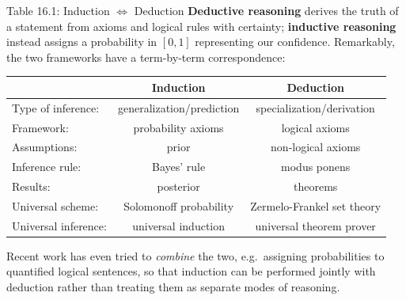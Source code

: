 \documentclass[aspectratio=169,10pt]{beamer}
\begin{document}
\begin{frame}{Table 16.1: Induction $\Leftrightarrow$ Deduction}
  \small
  \textbf{Deductive reasoning} derives the truth of a statement from
  axioms and logical rules with certainty; \textbf{inductive reasoning}
  instead assigns a probability in $[0,1]$ representing our confidence.
  Remarkably, the two frameworks have a term-by-term correspondence:

  \begin{center}
  \renewcommand{\arraystretch}{1.15}
  \begin{tabular}{lcc}
    \toprule
     & \textbf{Induction} & \textbf{Deduction} \\
    \midrule
    Type of inference: & generalization/prediction & specialization/derivation \\
    Framework:         & probability axioms         & logical axioms \\
    Assumptions:       & prior                       & non-logical axioms \\
    Inference rule:     & Bayes' rule                 & modus ponens \\
    Results:            & posterior                   & theorems \\
    Universal scheme:   & Solomonoff probability      & Zermelo-Frankel set theory \\
    Universal inference: & universal induction        & universal theorem prover \\
    \bottomrule
  \end{tabular}
  \end{center}
  \vspace{0.4em}
  Recent work has even tried to \emph{combine} the two, e.g.\ assigning
  probabilities to quantified logical sentences, so that induction can be
  performed jointly with deduction rather than treating them as separate
  modes of reasoning.
\end{frame}
\end{document}
